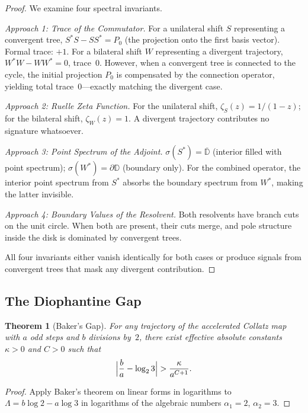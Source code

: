 \documentclass[12pt,a4paper]{article}
\newtheorem{theorem}{Theorem}[section]
\theoremstyle{definition}
\theoremstyle{remark}
\begin{document}
\begin{proof}
We examine four spectral invariants.

\textit{Approach 1: Trace of the Commutator.}
For a unilateral shift $S$ representing a convergent tree,
$S^*S-SS^*=P_0$ (the projection onto the first basis vector).
Formal trace: $+1$.
For a bilateral shift $W$ representing a divergent trajectory,
$W^*W-WW^*=0$, trace~$0$.
However, when a convergent tree is connected to the cycle, the initial
projection $P_0$ is compensated by the connection operator, yielding
total trace~$0$---exactly matching the divergent case.

\textit{Approach 2: Ruelle Zeta Function.}
For the unilateral shift, $\zeta_S(z)=1/(1-z)$; for the bilateral
shift, $\zeta_W(z)=1$.
A divergent trajectory contributes no signature whatsoever.

\textit{Approach 3: Point Spectrum of the Adjoint.}
$\sigma(S^*)=\overline{\mathbb D}$ (interior filled with point
spectrum); $\sigma(W^*)=\partial\mathbb D$ (boundary only).
For the combined operator, the interior point spectrum from $S^*$
absorbs the boundary spectrum from $W^*$, making the latter invisible.

\textit{Approach 4: Boundary Values of the Resolvent.}
Both resolvents have branch cuts on the unit circle.
When both are present, their cuts merge, and pole structure inside the
disk is dominated by convergent trees.

All four invariants either vanish identically for both cases or produce
signals from convergent trees that mask any divergent contribution.
\end{proof}

\subsection{The Diophantine Gap}

\begin{theorem}[Baker's Gap]\label{thm:baker}
For any trajectory of the accelerated Collatz map with $a$ odd steps
and $b$ divisions by~$2$, there exist effective absolute constants
$\kappa>0$ and $C>0$ such that
\[
\Bigl|\frac{b}{a}-\log_23\Bigr|>\frac{\kappa}{a^{C+1}}.
\]
\end{theorem}

\begin{proof}
Apply Baker's theorem on linear forms in logarithms to
$\Lambda=b\log2-a\log3$ in logarithms of the algebraic numbers
$\alpha_1=2$, $\alpha_2=3$.
\end{proof}
\end{document}
